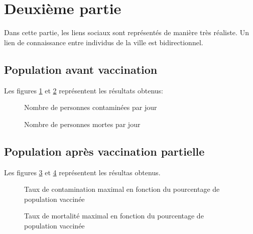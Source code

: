 \documentclass[12pt,a4paper,titlepage]{report}
\begin{document}

\section*{Deuxième partie}
Dans cette partie, les liens sociaux sont représentés de manière très réaliste. Un lien de 
connaissance entre individus de la ville est bidirectionnel.  
\subsection*{Population avant vaccination}
Les figures \ref{fig:2-1-nb-malades} et \ref{fig:2-1-nb-morts} représentent les résultats obtenus:
\begin{figure}[h]
  \centering
  \caption{Nombre de personnes contaminées par jour}
  \label{fig:2-1-nb-malades}
\end{figure}

\begin{figure}[h]
  \centering
  \caption{Nombre de personnes mortes par jour}
  \label{fig:2-1-nb-morts}
\end{figure}

\subsection*{Population après vaccination partielle}
Les figures \ref{fig:2-2-nb-malades} 
et \ref{fig:2-2-nb-morts} représentent les résultas obtenus.
\begin{figure}[h]
  \centering
  \caption{Taux de contamination maximal en fonction du pourcentage de population vaccinée}
  \label{fig:2-2-nb-malades}
\end{figure}

 \begin{figure}[h]
  \centering
  \caption{Taux de mortalité maximal en fonction du pourcentage de population vaccinée}
  \label{fig:2-2-nb-morts}
\end{figure}
\end{document}

